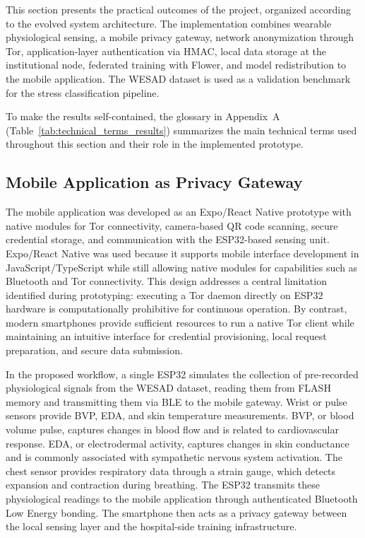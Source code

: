 \documentclass[12pt]{article}
\begin{document}
This section presents the practical outcomes of the project, organized according to the evolved system architecture. The implementation combines wearable physiological sensing, a mobile privacy gateway, network anonymization through Tor, application-layer authentication via HMAC, local data storage at the institutional node, federated training with Flower, and model redistribution to the mobile application. The WESAD dataset is used as a validation benchmark for the stress classification pipeline.

To make the results self-contained, the glossary in Appendix~A (Table~\ref{tab:technical_terms_results}) summarizes the main technical terms used throughout this section and their role in the implemented prototype.



\subsection{Mobile Application as Privacy Gateway}

The mobile application was developed as an Expo/React Native prototype with native modules for Tor connectivity, camera-based QR code scanning, secure credential storage, and communication with the ESP32-based sensing unit. Expo/React Native was used because it supports mobile interface development in JavaScript/TypeScript while still allowing native modules for capabilities such as Bluetooth and Tor connectivity. This design addresses a central limitation identified during prototyping: executing a Tor daemon directly on ESP32 hardware is computationally prohibitive for continuous operation. By contrast, modern smartphones provide sufficient resources to run a native Tor client while maintaining an intuitive interface for credential provisioning, local request preparation, and secure data submission.

In the proposed workflow, a single ESP32 simulates the collection of pre-recorded physiological signals from the WESAD dataset, reading them from FLASH memory and transmitting them via BLE to the mobile gateway. Wrist or pulse sensors provide BVP, EDA, and skin temperature measurements. BVP, or blood volume pulse, captures changes in blood flow and is related to cardiovascular response. EDA, or electrodermal activity, captures changes in skin conductance and is commonly associated with sympathetic nervous system activation. The chest sensor provides respiratory data through a strain gauge, which detects expansion and contraction during breathing. The ESP32 transmits these physiological readings to the mobile application through authenticated Bluetooth Low Energy bonding. The smartphone then acts as a privacy gateway between the local sensing layer and the hospital-side training infrastructure.
\end{document}
